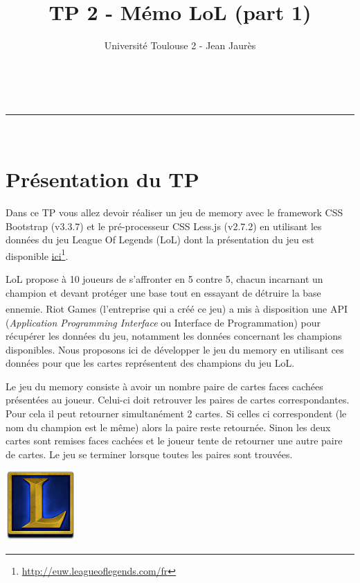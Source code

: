 \documentclass[a4paper,11pt]{article}
\makeatletter
\newcommand{\linia}{\rule{\linewidth}{0.5pt}}
\theoremstyle{mytheor}
\renewcommand{\maketitle}{
\begin{center}
\vspace{2ex}
{\huge \textsc{\@title}}
\vspace{1ex}
\\
\linia\\
\@author \hfill \@date
\vspace{4ex}
\end{center}
}
\makeatother
\begin{document}
\title{TP 2 - Mémo LoL (part 1)}

\author{Université Toulouse 2 - Jean Jaurès}


\maketitle
\tableofcontents

\section*{Présentation du TP}
Dans ce TP vous allez devoir réaliser un jeu de memory avec le framework CSS Bootstrap (v3.3.7) et le pré-processeur CSS Less.js (v2.7.2) en utilisant les données du jeu League Of Legends (LoL) dont la présentation du jeu est disponible \href{http://euw.leagueoflegends.com/fr}{ici}\footnote{\url{http://euw.leagueoflegends.com/fr}}.

LoL propose à 10 joueurs de s'affronter en 5 contre 5, chacun incarnant un champion et devant protéger une base tout en essayant de détruire la base ennemie. Riot Games\textsuperscript{\texttrademark} (l'entreprise qui a créé ce jeu) a mis à disposition une API (\textit{Application Programming Interface} ou Interface de Programmation)  pour récupérer les données du jeu, notamment les données concernant les champions disponibles. Nous proposons ici de développer le jeu du memory en utilisant ces données pour que les cartes représentent des champions du jeu LoL. 

Le jeu du memory consiste à avoir un nombre paire de cartes faces cachées présentées au joueur. Celui-ci doit retrouver les paires de cartes correspondantes. Pour cela il peut retourner simultanément 2 cartes. Si celles ci correspondent (le nom du champion est le même) alors la paire reste retournée. Sinon les deux cartes sont remises faces cachées et le joueur tente de retourner une autre paire de cartes. Le jeu se terminer lorsque toutes les paires sont trouvées. \\


\begin{center}
\includegraphics[width=0.2\textwidth]{img/lol.png} \\
\end{center}
\end{document}
